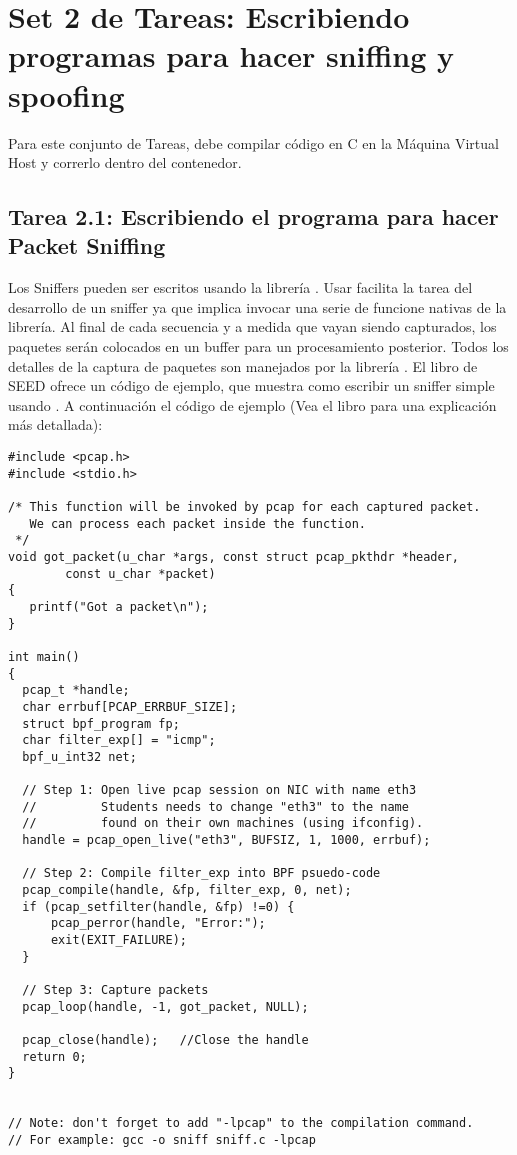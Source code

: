 \section{Set 2 de Tareas: Escribiendo programas para hacer sniffing y spoofing}

Para este conjunto de Tareas, debe compilar código en C en la Máquina Virtual Host y correrlo dentro del contenedor.

\subsection{Tarea 2.1: Escribiendo el programa para hacer Packet Sniffing}

Los Sniffers pueden ser escritos usando la librería \pcap. Usar \pcap facilita la tarea del desarrollo de un sniffer ya que implica invocar una serie de funcione nativas de la librería. Al final de cada secuencia y a medida que vayan siendo capturados, los paquetes serán colocados en un buffer para un procesamiento posterior.
Todos los detalles de la captura de paquetes son manejados por la librería \pcap.
El libro de SEED ofrece un código de ejemplo, que muestra como escribir un sniffer simple usando \pcap. 
A continuación el código de ejemplo (Vea el libro para una explicación más detallada):


\begin{lstlisting}
#include <pcap.h>
#include <stdio.h>

/* This function will be invoked by pcap for each captured packet.
   We can process each packet inside the function.  
 */
void got_packet(u_char *args, const struct pcap_pkthdr *header,
        const u_char *packet)
{
   printf("Got a packet\n");
}

int main()
{
  pcap_t *handle;
  char errbuf[PCAP_ERRBUF_SIZE];
  struct bpf_program fp;
  char filter_exp[] = "icmp";
  bpf_u_int32 net;

  // Step 1: Open live pcap session on NIC with name eth3
  //         Students needs to change "eth3" to the name 
  //         found on their own machines (using ifconfig).
  handle = pcap_open_live("eth3", BUFSIZ, 1, 1000, errbuf); 

  // Step 2: Compile filter_exp into BPF psuedo-code
  pcap_compile(handle, &fp, filter_exp, 0, net);            
  if (pcap_setfilter(handle, &fp) !=0) {                   
      pcap_perror(handle, "Error:");
      exit(EXIT_FAILURE);
  }

  // Step 3: Capture packets
  pcap_loop(handle, -1, got_packet, NULL);                  

  pcap_close(handle);   //Close the handle
  return 0;
}


// Note: don't forget to add "-lpcap" to the compilation command.
// For example: gcc -o sniff sniff.c -lpcap
\end{lstlisting}

